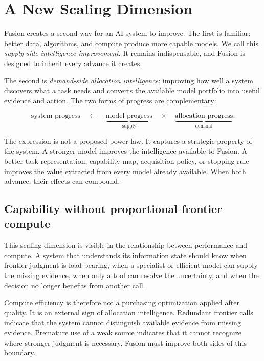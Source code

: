 \section{A New Scaling Dimension}

Fusion creates a second way for an AI system to improve. The first is familiar:
better data, algorithms, and compute produce more capable models. We call this
\emph{supply-side intelligence improvement}. It remains indispensable, and
Fusion is designed to inherit every advance it creates.

The second is \emph{demand-side allocation intelligence}: improving how well a
system discovers what a task needs and converts the available model portfolio
into useful evidence and action. The two forms of progress are complementary:

\begin{equation}
  \text{system progress}
  \quad\longleftarrow\quad
  \underbrace{\text{model progress}}_{\text{supply}}
  \quad\times\quad
  \underbrace{\text{allocation progress}}_{\text{demand}}.
\end{equation}

The expression is not a proposed power law. It captures a strategic property
of the system. A stronger model improves the intelligence available to Fusion.
A better task representation, capability map, acquisition policy, or stopping
rule improves the value extracted from every model already available. When
both advance, their effects can compound.

\subsection{Capability without proportional frontier compute}

This scaling dimension is visible in the relationship between performance and
compute. A system that understands its information state should know when
frontier judgment is load-bearing, when a specialist or efficient model can
supply the missing evidence, when only a tool can resolve the uncertainty, and
when the decision no longer benefits from another call.

Compute efficiency is therefore not a purchasing optimization applied after
quality. It is an external sign of allocation intelligence. Redundant frontier
calls indicate that the system cannot distinguish available evidence from
missing evidence. Premature use of a weak source indicates that it cannot
recognize where stronger judgment is necessary. Fusion must improve both sides
of this boundary.

